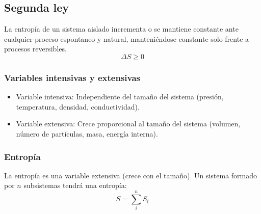 \documentclass[]{article}
\numberwithin{equation}{section}
\newcommand{\0}{\textcolor{gray}{0}}
\begin{document}
\subsection{Segunda ley}

La entropía de un sistema aislado incrementa o se mantiene constante ante cualquier proceso espontaneo y natural, manteniéndose constante solo frente a procesos reversibles.
\begin{equation}
	\Delta S \geq 0
\end{equation}

\subsubsection{Variables intensivas y extensivas}
\begin{itemize}
	\item Variable intensiva: Independiente del tamaño del sistema (presión, temperatura, densidad, conductividad).
	\item Variable extensiva: Crece proporcional al tamaño del sistema (volumen, número de partículas, masa, energía interna).
\end{itemize}

\subsubsection{Entropía}
La entropía es una variable extensiva (crece con el tamaño). Un sistema formado por $n$ subsistemas tendrá una entropía:
\begin{equation}
	S=\sum_{i}^{n}S_i
\end{equation}

\end{document}
